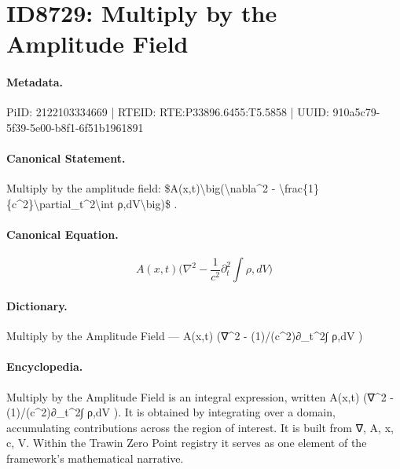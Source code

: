 \section*{ID8729: Multiply by the Amplitude Field}
\paragraph{Metadata.}
PiID: 2122103334669 | RTEID: RTE:P33896.6455:T5.5858 | UUID: 910a5c79-5f39-5e00-b8f1-6f51b1961891

\paragraph{Canonical Statement.}
Multiply by the amplitude field: \$A(x,t)\textbackslash{}big(\textbackslash{}nabla\textasciicircum{}2 - \textbackslash{}frac\{1\}\{c\textasciicircum{}2\}\textbackslash{}partial\_t\textasciicircum{}2\textbackslash{}int ρ,dV\textbackslash{}big)\$ .

\paragraph{Canonical Equation.}
\[
A(x,t)\big(\nabla^2 - \frac{1}{c^2}\partial_t^2\int ρ,dV\big)
\]

\paragraph{Dictionary.}
Multiply by the Amplitude Field — A(x,t) (∇\textasciicircum{}2 - (1)/(c\textasciicircum{}2)∂\_t\textasciicircum{}2∫ ρ,dV )

\paragraph{Encyclopedia.}
Multiply by the Amplitude Field is an integral expression, written A(x,t) (∇\textasciicircum{}2 - (1)/(c\textasciicircum{}2)∂\_t\textasciicircum{}2∫ ρ,dV ). It is obtained by integrating over a domain, accumulating contributions across the region of interest. It is built from ∇, A, x, c, V. Within the Trawin Zero Point registry it serves as one element of the framework's mathematical narrative.
